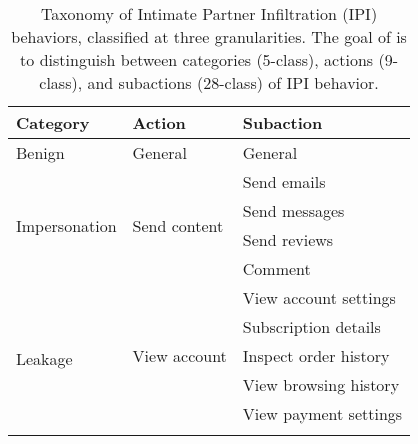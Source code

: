 

\begin{table}[h]
    \small
    \centering
    \caption{Taxonomy of Intimate Partner Infiltration (IPI) behaviors, classified at three granularities. The goal of \sys is to distinguish between categories (5-class), actions (9-class), and subactions (28-class) of IPI behavior.}
    \label{tab:actionsubaction}
    \begin{tabular}{@{}lll@{}}
    \toprule
    \textbf{Category}      & \textbf{Action}               & \textbf{Subaction}                   \\ \midrule
    \multirow{1}{*}{Benign} & General                      & General                               \\ \midrule
    \multirow{4}{*}{Impersonation} 
                           & \multirow{4}{*}{Send content} & Send emails                           \\
                           &                              & Send messages                         \\
                           &                              & Send reviews                          \\
                           &                              & Comment                               \\ \midrule
    \multirow{11}{*}{Leakage} 
                           & \multirow{5}{*}{View account} & View account settings                 \\
                           &                              & Subscription details                  \\
                           &                              & Inspect order history                 \\
                           &                              & View browsing history                 \\
                           &                              & View payment settings                 \\ \cmidrule{2-3}

\end{tabular}
\end{table}
